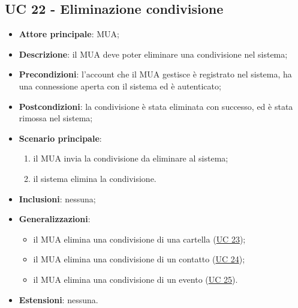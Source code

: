 \subsection{UC 22 - Eliminazione condivisione} \label{sec:UC22}
    \begin{itemize}
        \item \textbf{Attore principale}: MUA;
        \item \textbf{Descrizione}: il MUA deve poter eliminare una condivisione nel sistema;
        \item \textbf{Precondizioni}: l’account che il MUA gestisce è registrato nel sistema, ha una connessione aperta con il sistema ed è autenticato;
        \item \textbf{Postcondizioni}: la condivisione è stata eliminata con successo, ed è stata rimossa nel sistema;
        \item \textbf{Scenario principale}:
            \begin{enumerate}
                \item il MUA invia la condivisione da eliminare al sistema;
                \item il sistema elimina la condivisione.
            \end{enumerate}
        \item \textbf{Inclusioni}: nessuna;
        \item \textbf{Generalizzazioni}:
            \begin{itemize}
                \item il MUA elimina una condivisione di una cartella (\hyperref[sec:UC23]{UC 23});
                \item il MUA elimina una condivisione di un contatto (\hyperref[sec:UC24]{UC 24});
                \item il MUA elimina una condivisione di un evento (\hyperref[sec:UC25]{UC 25}).
            \end{itemize}
        \item \textbf{Estensioni}: nessuna.
    \end{itemize}